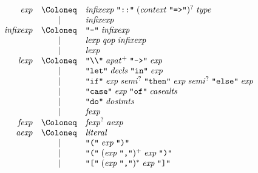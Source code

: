 \begin{align*}
  \begin{array}{rcl}
    \mathit{exp}
    & \Coloneq & \mathit{infixexp}\; \text{\texttt{\textquotedbl ::\textquotedbl}}\; (\mathit{context}\; \text{\texttt{\textquotedbl =>\textquotedbl}})^?\; \mathit{type} \\
    & \mid & \mathit{infixexp} \\
    \mathit{infixexp}
    & \Coloneq & \text{\texttt{\textquotedbl -\textquotedbl}}\; \mathit{infixexp} \\
    & \mid & \mathit{lexp}\; \mathit{qop}\; \mathit{infixexp} \\
    & \mid & \mathit{lexp} \\
    \mathit{lexp}
    & \Coloneq & \text{\texttt{\textquotedbl\textbackslash\textbackslash\textquotedbl}}\; \mathit{apat}^+\; \text{\texttt{\textquotedbl ->\textquotedbl}}\; \mathit{exp} \\
    & \mid & \text{\texttt{\textquotedbl let\textquotedbl}}\; \mathit{decls}\; \text{\texttt{\textquotedbl in\textquotedbl}}\; \mathit{exp} \\
    & \mid & \text{\texttt{\textquotedbl if\textquotedbl}}\; \mathit{exp}\; \mathit{semi}^?\; \text{\texttt{\textquotedbl then\textquotedbl}}\; \mathit{exp}\; \mathit{semi}^?\; \text{\texttt{\textquotedbl else\textquotedbl}}\; \mathit{exp} \\
    & \mid & \text{\texttt{\textquotedbl case\textquotedbl}}\; \mathit{exp}\; \text{\texttt{\textquotedbl of\textquotedbl}}\; \mathit{casealts} \\
    & \mid & \text{\texttt{\textquotedbl do\textquotedbl}}\; \mathit{dostmts} \\
    & \mid & \mathit{fexp} \\
    \mathit{fexp}
    & \Coloneq & \mathit{fexp}^?\; \mathit{aexp} \\
    \mathit{aexp}
    & \Coloneq & \mathit{literal} \\
    & \mid & \text{\texttt{\textquotedbl(\textquotedbl}}\; \mathit{exp}\; \text{\texttt{\textquotedbl)\textquotedbl}} \\
    & \mid & \text{\texttt{\textquotedbl(\textquotedbl}}\; (\mathit{exp}\; \text{\texttt{\textquotedbl,\textquotedbl}})^+\; \mathit{exp}\; \text{\texttt{\textquotedbl)\textquotedbl}} \\
    & \mid & \text{\texttt{\textquotedbl[\textquotedbl}}\; (\mathit{exp}\; \text{\texttt{\textquotedbl,\textquotedbl}})^*\; \mathit{exp}\; \text{\texttt{\textquotedbl]\textquotedbl}} \\

\end{array}
\end{align*}
